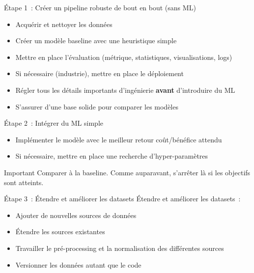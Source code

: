 \begin{frame}{Étape 1~: Créer un pipeline robuste de bout en bout (sans ML)}
  \begin{itemize}[<+->]
  \item Acquérir et nettoyer les données
  \item Créer un modèle baseline avec une heuristique simple
  \item Mettre en place l'évaluation (métrique, statistiques, visualisations, logs)
  \item Si nécessaire (industrie), mettre en place le déploiement
  \end{itemize}


  \begin{itemize}[<+->]
    \item Régler tous les détails importants d'ingénierie \textbf{avant} d'introduire du ML
    \item S'assurer d'une base solide pour comparer les modèles
  \end{itemize}

\end{frame}

\begin{frame}{Étape 2~: Intégrer du ML simple}
  \begin{itemize}[<+->]
    \item Implémenter le modèle avec le meilleur retour coût/bénéfice attendu
    \item Si nécessaire, mettre en place une recherche d'hyper-paramètres
  \end{itemize}

  \begin{alertblock}{Important}
    Comparer à la baseline. Comme auparavant, s'arrêter là si les objectifs sont atteints.
  \end{alertblock}
\end{frame}

\begin{frame}{Étape 3~: Étendre et améliorer les datasets}
  Étendre et améliorer les datasets~:

  \begin{itemize}[<+->]
    \item Ajouter de nouvelles sources de données
    \item Étendre les sources existantes
    \item Travailler le pré-processing et la normalisation des différentes sources
    \item Versionner les données autant que le code
  \end{itemize}
\end{frame}


